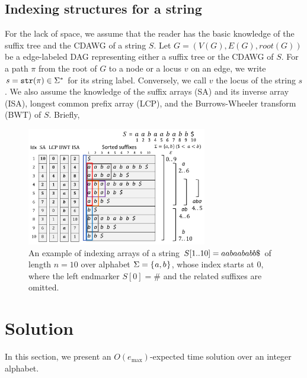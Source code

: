 \documentclass{article}
\begin{document}
\subsection{Indexing structures for a string}
For the lack of space, we assume that the reader has the basic knowledge of the suffix tree and the CDAWG of a string $S$. Let $G = (V(G), E(G), root(G))$ be a edge-labeled DAG representing either a suffix tree or the CDAWG of $S$. For a path $\pi$ from the root of $G$ to a node or a locus $v$ on an edge, we write $s = \mathtt{str}(\pi) \in \Sigma^*$ for its string label. Conversely, we call $v$ the locus of the string $s$. 
We also assume the knowledge of the suffix arrays (SA) and its inverse array (ISA), longest common prefix array (LCP), and the Burrows-Wheeler transform (BWT) of $S$. Briefly, 

\begin{figure}[t]
\centering  
\includegraphics[width=0.70\textwidth]{fig1.pdf}
\vspace{.5\baselineskip}
\caption{An example of indexing arrays of a string $S[1..10] = aabaababb\daller$ of length $n = 10$ over alphabet $\Sigma = \{\kern0.05ema, b\kern0.05em\}$, whose index starts at $0$, where the left endmarker $S[0]=\#$ and the related suffixes are omitted. 
}\label{fig:example:arrays}
\end{figure}

\section{Solution}
\label{sec:solution}

In this section, we present an $O(e_{\max})$-expected time solution over an integer alphabet.
\end{document}

